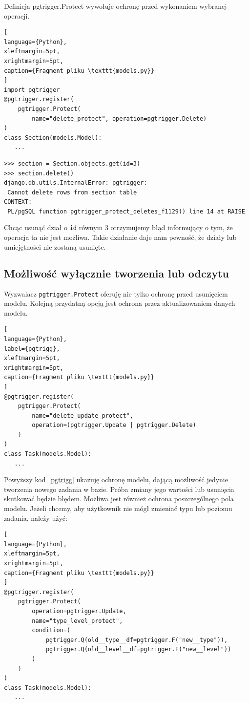 \documentclass[oneside,polski,logo,indent]{amuthesis}
\begin{document}
Definicja pgtrigger.Protect wywołuje ochronę przed wykonaniem wybranej operacji.
\begin{lstlisting}[
language={Python},
xleftmargin=5pt,
xrightmargin=5pt,
caption={Fragment pliku \texttt{models.py}}
]
import pgtrigger
@pgtrigger.register(
    pgtrigger.Protect(
        name="delete_protect", operation=pgtrigger.Delete)
)
class Section(models.Model):
   ...
\end{lstlisting}
\begin{lstlisting}[style=DOS]
>>> section = Section.objects.get(id=3)
>>> section.delete()
django.db.utils.InternalError: pgtrigger: 
 Cannot delete rows from section table
CONTEXT:  
 PL/pgSQL function pgtrigger_protect_deletes_f1129() line 14 at RAISE
\end{lstlisting}
Chcąc usunąć dział o \texttt{id} równym 3 otrzymujemy błąd informujący o tym, że operacja ta nie jest możliwa. Takie działanie daje nam pewność, że działy lub umiejętności nie zostaną usunięte.
\begin{center}
\subsection{Możliwość wyłącznie tworzenia lub odczytu}
\end{center}

Wyzwalacz \texttt{pgtrigger.Protect} oferuję nie tylko ochronę przed usunięciem modelu. Kolejną przydatną opcją jest ochrona przez aktualizowaniem danych modelu.
\begin{lstlisting}[
language={Python},
label={pgtrigg},
xleftmargin=5pt,
xrightmargin=5pt,
caption={Fragment pliku \texttt{models.py}}
]
@pgtrigger.register(
    pgtrigger.Protect(
        name="delete_update_protect",
        operation=(pgtrigger.Update | pgtrigger.Delete)
    )
)
class Task(models.Model):
   ...
\end{lstlisting}
Powyższy kod~\ref{pgtrigg} ukazuję ochronę modelu, dającą możliwość jedynie tworzenia nowego zadania w bazie. Próba zmiany jego wartości lub usunięcia skutkować będzie błędem. Możliwa jest również ochrona poszczególnego pola modelu.
Jeżeli chcemy, aby użytkownik nie mógł zmieniać typu lub poziomu zadania, należy użyć:

\begin{lstlisting}[
language={Python},
xleftmargin=5pt,
xrightmargin=5pt,
caption={Fragment pliku \texttt{models.py}}
]
@pgtrigger.register(
    pgtrigger.Protect(
        operation=pgtrigger.Update,
        name="type_level_protect",
        condition=(
            pgtrigger.Q(old__type__df=pgtrigger.F("new__type")),
            pgtrigger.Q(old__level__df=pgtrigger.F("new__level"))
        )
    )
)
class Task(models.Model):
   ...
\end{lstlisting}
\end{document}
